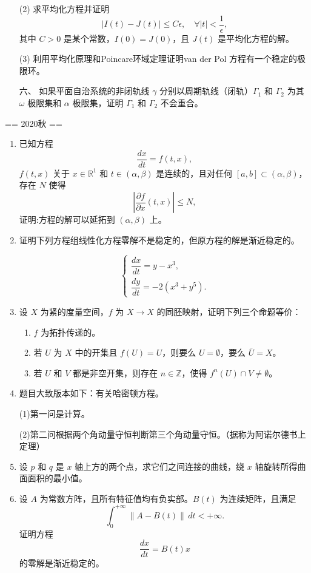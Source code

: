 \begin{enumerate}
        (2) 求平均化方程并证明
        \[
        |I(t) - J(t)| \leq C\epsilon, \quad \forall |t| < \frac{1}{\epsilon},
        \]
        其中 \( C > 0 \) 是某个常数，\( I(0) = J(0) \)，且 \( J(t) \) 是平均化方程的解。
        
        (3) 利用平均化原理和Poincare环域定理证明van der Pol 方程有一个稳定的极限环。


    \item[六、] 如果平面自治系统的非闭轨线 \(\gamma\) 分别以周期轨线（闭轨）\(\Gamma_1\) 和 \(\Gamma_2\) 为其 \(\omega\) 极限集和 \(\alpha\) 极限集，证明 \(\Gamma_1\) 和 \(\Gamma_2\) 不会重合。
\end{enumerate}


== 2020秋 ==
\begin{enumerate}
\item
已知方程
\[
\frac{dx}{dt} = f(t, x),
\]
 \(f(t, x)\) 关于 \(x \in \mathbb{R}^1\) 和 \(t \in (\alpha, \beta)\) 是连续的，且对任何 \([a, b] \subset (\alpha, \beta)\)，存在 \(N\) 使得  
\[
\left| \frac{\partial f}{\partial x}(t, x) \right| \leq N,
\]
证明:方程的解可以延拓到 \((\alpha, \beta)\) 上。

\item
证明下列方程组线性化方程零解不是稳定的，但原方程的解是渐近稳定的。

\[
\begin{cases}
\dfrac{dx}{dt} = y - x^3, \\[6pt]
\dfrac{dy}{dt} = -2(x^3 + y^5).
\end{cases}
\]

\item
设 \(X\) 为紧的度量空间，\(f\) 为 \(X \to X\) 的同胚映射，证明下列三个命题等价：

\begin{enumerate}
    \item \(f\) 为拓扑传递的。
    \item 若 \(U\) 为 \(X\) 中的开集且 \(f(U) = U\)，则要么 \(U = \emptyset\)，要么 \(\bar{U} = X\)。
    \item 若 \(U\) 和 \(V\) 都是非空开集，则存在 \(n \in \mathbb{Z}\)，使得 \(f^n(U) \cap V \neq \emptyset\)。
\end{enumerate}



\item
题目大致版本如下：有关哈密顿方程。

(1)第一问是计算。  

(2)第二问根据两个角动量守恒判断第三个角动量守恒。（据称为阿诺尔德书上定理）


\item
设 \(p\) 和 \(q\) 是 \(x\) 轴上方的两个点，求它们之间连接的曲线，绕 \(x\) 轴旋转所得曲面面积的最小值。

\item
设 \(A\) 为常数方阵，且所有特征值均有负实部。\(B(t)\) 为连续矩阵，且满足
\[
\int_{0}^{+\infty} \|A - B(t)\| \, dt < +\infty.
\]
证明方程
\[
\frac{dx}{dt} = B(t)x
\]
的零解是渐近稳定的。
\end{enumerate}


